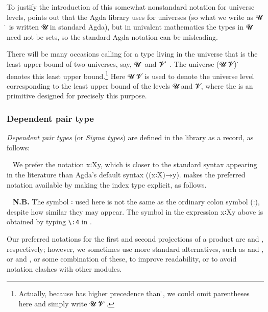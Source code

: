 To justify the introduction of this somewhat nonstandard notation for universe levels, \mhe points out that the Agda library uses  for universes (so what we write as \ab 𝓤 ̇ is written \Set{}\ab 𝓤 in standard Agda), but in univalent mathematics the types in \ab 𝓤 ̇ need not be sets, so the standard Agda notation can be misleading.

There will be many occasions calling for a type living in the universe that is the least upper bound of two universes, say, \ab 𝓤 ̇ and \ab 𝓥 ̇ . The universe (\ab 𝓤  \ab 𝓥) ̇ denotes this least upper bound.\footnote{Actually, because \AgdaUnderscore{}\AgdaUnderscore{} has higher precedence than \AgdaUnderscore{}̇, we could omit parentheses here and simply write \ab 𝓤  \ab 𝓥 ̇.} Here \ab 𝓤  \ab 𝓥 is used to denote the universe level corresponding to the least upper bound of the levels \ab 𝓤 and \ab 𝓥, where the \AgdaUnderscore{}\AgdaUnderscore{} is an \agda primitive designed for precisely this purpose.

\subsubsection{Dependent pair type}\label{dependent-pair-type}
\textit{Dependent pair types} (or \textit{Sigma types}) are defined in the \typetopology library as a record, as follows:
\ccpad

~\ccpad
We prefer the notation \ab x꞉\ab X\AgdaComma{}y, which is closer to the standard syntax appearing in the literature than Agda's default syntax ((\ab x꞉\ab X)\as →\ab y). \mhe makes the preferred notation available by making the index type explicit, as follows.
\ccpad

~\ccpad
\textbf{N.B.} The symbol ꞉ used here is not the same as the ordinary colon symbol (:), despite how similar they may appear. The symbol in the expression \ab x꞉\ab X\AgdaComma{}\ab y above is obtained by typing \texttt{\textbackslash{}:4} in \agdatwomode.

\newcommand\FstUnder{\AgdaOperator{\AgdaFunction{∣\AgdaUnderscore{}∣}}\xspace}
\newcommand\SndUnder{\AgdaOperator{\AgdaFunction{∥\AgdaUnderscore{}∥}}\xspace}
Our preferred notations for the first and second projections of a product are \FstUnder and \SndUnder, respectively; however, we sometimes use more standard alternatives, such as  and , or  and , or some combination of these, to improve readability, or to avoid notation clashes with other modules.
\ccpad


